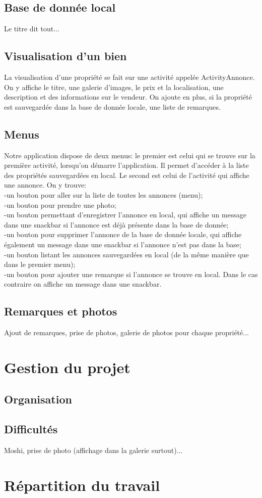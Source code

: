 \documentclass[a4paper,12pt]{article} %
\begin{document}
\subsection{Base de donnée local}
Le titre dit tout...

\subsection{Visualisation d'un bien}
La visualisation d'une propriété se fait sur une activité appelée ActivityAnnonce.
On y affiche le titre, une galerie d'images, le prix et la localisation, une description et des informations sur le vendeur. On ajoute en plus, si la propriété est sauvegardée dans la base de donnée locale, une liste de remarques.

\subsection{Menus}
Notre application dispose de deux menus: le premier est celui qui se trouve sur la première activité, lorsqu'on démarre l'application. Il permet d'accéder à la liste des propriétés sauvegardées en local. Le second est celui de l'activité qui affiche une annonce. On y trouve:\\
    -un bouton pour aller sur la liste de toutes les annonces (menu);\\
    -un bouton pour prendre une photo;\\
    -un bouton permettant d'enregistrer l'annonce en local, qui affiche un message dans une snackbar si l'annonce est déjà présente dans la base de donnée;\\
    -un bouton pour supprimer l'annonce de la base de donnée locale, qui affiche également un message dans une snackbar si l'annonce n'est pas dans la base;\\
    -un bouton listant les annonces sauvegardées en local (de la même manière que dans le premier menu);\\
    -un bouton pour ajouter une remarque si l'annonce se trouve en local. Dans le cas contraire on affiche un message dans une snackbar.

\subsection{Remarques et photos}
Ajout de remarques, prise de photos, galerie de photos pour chaque propriété...


\section{Gestion du projet}

\subsection{Organisation}

\subsection{Difficultés}
Moshi, prise de photo (affichage dans la galerie surtout)...


\section{Répartition du travail}
\end{document}
